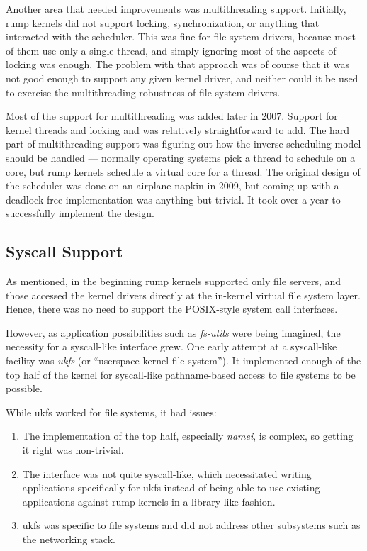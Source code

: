 Another area that needed improvements was multithreading support.
Initially, rump kernels did not support locking, synchronization, or
anything that interacted with the scheduler.  This was fine for file
system drivers, because most of them use only a single thread, and
simply ignoring most of the aspects of locking was enough.  The problem
with that approach was of course that it was not good enough to support
any given kernel driver, and neither could it be used to exercise the
multithreading robustness of file system drivers.

Most of the support for multithreading was added later in 2007.  Support
for kernel threads and locking and was relatively straightforward to add.
The hard part of multithreading support was figuring out how the inverse
scheduling model should be handled --- normally operating systems pick a
thread to schedule on a core, but rump kernels schedule a virtual core for
a thread.  The original design of the scheduler was done on an airplane
napkin in 2009, but coming up with a deadlock free implementation was
anything but trivial.  It took over a year to successfully implement
the design.


\subsection{Syscall Support}

As mentioned, in the beginning rump kernels supported only file servers,
and those accessed the kernel drivers directly at the in-kernel virtual
file system layer.  Hence, there was no need to support the POSIX-style
system call interfaces.

However, as application possibilities such as \textit{fs-utils}
were being imagined, the necessity for a syscall-like interface grew.
One early attempt at a syscall-like facility was \textit{ukfs} (or
``userspace kernel file system'').  It implemented enough of the top half
of the kernel for syscall-like pathname-based access to file systems to
be possible.

While ukfs worked for file systems, it had issues:
\begin{enumerate}
\item	The implementation of the top half, especially \textit{namei},
	is complex, so getting it right was non-trivial.
\item	The interface was not quite syscall-like, which necessitated
	writing applications specifically for ukfs instead of being able
	to use existing applications against rump kernels in a library-like
	fashion.
\item	ukfs was specific to file systems and did not address
	other subsystems such as the networking stack.
\end{enumerate}

